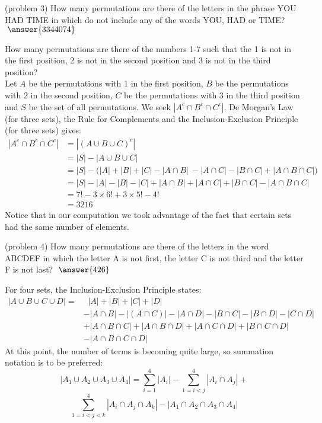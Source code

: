 \documentclass[handout]{ximera}
\begin{document}
\begin{problem}(problem 3)
How many permutations are there of the letters in the phrase YOU HAD TIME in which do not include any of the  
 words YOU, HAD or TIME? $\; \answer{3344074}$
\end{problem}

\begin{example}[example 4]
How many permutations are there of the numbers 1-7 such that the 1 is not in the first position, 2 is not in the 
second position and 3 is not in the third position?\\
Let $A$ be the permutations with 1 in the first position, $B$ be the permutations with 2 in the 
second position, $C$ be the permutations with 3 in the third position and $S$ be the set of all permutations. 
We seek $|A^c \cap B^c \cap C^c|$. 
De Morgan's Law (for three sets), the Rule for Complements and the Inclusion-Exclusion Principle (for three sets) gives:
\begin{align*}
|A^c \cap B^c \cap C^c| &= |(A \cup B \cup C)^c|\\
               &= |S| - |A\cup B \cup C|\\
               &= |S| - \Big(|A| + |B| + |C| - |A\cap B|\ - |A\cap C| - |B\cap C| + |A \cap B \cap C| \Big)\\
               &= |S| - |A| - |B| - |C| + |A\cap B| + |A\cap C| + |B\cap C| - |A\cap B \cap C|\\
               &= 7! - 3 \times 6! + 3 \times 5! - 4!\\
               &= 3216
\end{align*}
Notice that in our computation we took advantage of the fact that certain sets had the same number of elements.
\end{example}


\begin{problem}(problem 4)
How many permutations are there of the letters in the word ABCDEF in which the letter A is not 
first, the letter C is not third and the letter F is not last? $\; \answer{426}$
\end{problem}




For four sets, the Inclusion-Exclusion Principle states:
\begin{align*}
|A \cup B \cup C \cup D | = &\;\;|A|  + |B| + |C| + |D| \\
&- |A \cap B| - | (A \cap C)| - |A \cap D| - |B\cap C| - | B \cap D| 
- |C \cap D| \\
& +|A\cap B\cap C| + |A\cap B\cap D|+|A\cap C\cap D|+| B\cap C\cap D| \\
&- |A\cap B\cap C \cap D|
\end{align*}
At this point, the number of terms is becoming quite large, so summation notation is to be preferred:
\[
|A_1 \cup A_2 \cup A_3 \cup A_4 | = \sum_{i = 1}^4 |A_i| - \sum_{1 = i < j}^4 |A_i \cap A_j| + 
\]
\[
\sum_{1 = i < j< k }^4 |A_i \cap A_j \cap A_k| - |A_1 \cap A_2 \cap A_3 \cap A_4 |
\]
\end{document}
